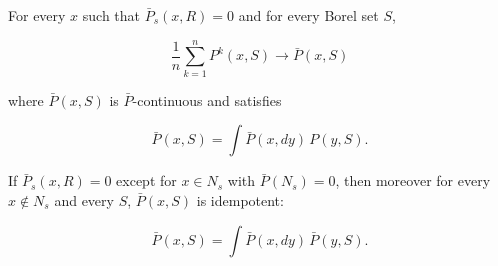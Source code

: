 For every $x$ such that $\bar{P}_s(x, R) = 0$ and for every Borel set $S$,

$$\frac{1}{n} \sum_{k=1}^{n} P^k(x, S) \rightarrow \bar{P}(x, S)$$

where $\bar{P}(x, S)$ is $\bar{P}$-continuous and satisfies

$$\bar{P}(x, S) = \int \bar{P}(x, dy) \, P(y, S).$$

If $\bar{P}_s(x, R) = 0$ except for $x \in N_s$ with $\bar{P}(N_s) = 0$, then moreover for every $x \notin N_s$ and every $S$, $\bar{P}(x, S)$ is idempotent:

$$\bar{P}(x, S) = \int \bar{P}(x, dy) \, \bar{P}(y, S).$$
